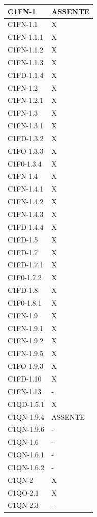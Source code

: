 \begin{footnotesize}
\begin{longtable}{|p{}|p{}|}
 C1FN-1 &ASSENTE \\ \hline
 C1FN-1.1 &X  \\ \hline
 C1FN-1.1.1 &X  \\ \hline
 C1FN-1.1.2  &X  \\ \hline
 C1FN-1.1.3 &X  \\ \hline
 C1FD-1.1.4  &X  \\ \hline
 C1FN-1.2 &X  \\ \hline
 C1FN-1.2.1 &X  \\ \hline
 C1FN-1.3 &X  \\ \hline
 C1FN-1.3.1  &X  \\ \hline
 C1FD-1.3.2 &X  \\ \hline
 C1FO-1.3.3 &X  \\ \hline
 C1F0-1.3.4 &X  \\ \hline
 C1FN-1.4 &X  \\ \hline
 C1FN-1.4.1 &X  \\ \hline
 C1FN-1.4.2 &X  \\ \hline
 C1FN-1.4.3 &X  \\ \hline
 C1FD-1.4.4 &X  \\ \hline
 C1FD-1.5 &X  \\ \hline
 C1FD-1.7 &X  \\ \hline
 C1FD-1.7.1  &X  \\ \hline
 C1F0-1.7.2 &X  \\ \hline
 C1FD-1.8 &X  \\ \hline
 C1F0-1.8.1 &X  \\ \hline
 C1FN-1.9 &X  \\ \hline
 C1FN-1.9.1  &X  \\ \hline
 C1FN-1.9.2 &X  \\ \hline
 C1FN-1.9.5 &X  \\ \hline
 C1FO-1.9.3 &X  \\ \hline
 C1FD-1.10 &X  \\ \hline
 C1FN-1.13 &-  \\ \hline
 C1QD-1.5.1 &X  \\ \hline
 C1QN-1.9.4 &ASSENTE  \\ \hline
 C1QN-1.9.6 &-  \\ \hline
 C1QN-1.6 &- \\ \hline
 C1QN-1.6.1&- \\ \hline
 C1QN-1.6.2&-   \\ \hline
 C1QN-2&X \\ \hline
 C1QO-2.1&X \\ \hline
 C1QN-2.3&-  \\ \hline

\end{longtable}
\end{footnotesize}
